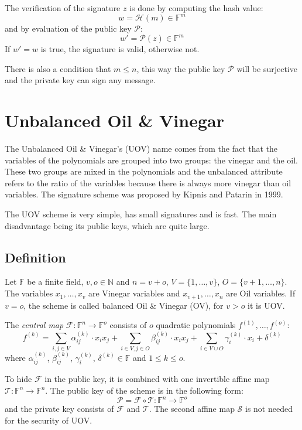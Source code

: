 \documentclass[thesis=M,english]{FITthesis}[2019/12/23]
\begin{document}
The verification of the signature $z$ is done by computing the hash value:
\[
w = \mathcal{H}(m) \in \mathbb{F}^m
\]
and by evaluation of the public key $\mathcal{P}$:
\[
w' = \mathcal{P}(z) \in \mathbb{F}^m
\]
If $w' = w$ is true, the signature is valid, otherwise not.

There is also a condition that $m \leq n$, this way the public key $\mathcal{P}$ will be surjective and the private key can sign any message.

\section{Unbalanced Oil \& Vinegar}
The Unbalanced Oil \& Vinegar's (UOV) name comes from the fact that the variables of the polynomials are grouped into two groups: the vinegar and the oil. These two groups are mixed in the polynomials and the unbalanced attribute refers to the ratio of the variables because there is always more vinegar than oil variables. The signature scheme was proposed by Kipnis and Patarin in 1999.

\bigskip
\noindent
The UOV scheme is very simple, has small signatures and is fast. The main disadvantage being its public keys, which are quite large.

\subsection{Definition}
Let $\mathbb{F}$ be a finite field, $v,o \in \mathbb{N}$ and $n=v+o$, $V=\{1, \ldots, v\}$, $O=\{v+1, \ldots, n\}$. The variables $x_1, \ldots, x_v$ are Vinegar variables and $x_{v+1}, \ldots, x_n$ are Oil variables. If $v=o$, the scheme is called balanced Oil \& Vinegar (OV), for $v>o$ it is UOV.

\bigskip
\noindent
The \textit{central map} $\mathcal{F}:\mathbb{F}^n \rightarrow \mathbb{F}^o$ consists of $o$ quadratic polynomials $f^{(1)}, \ldots, f^{(o)}$:
\[
f^{(k)} = \sum\limits_{i,j \in V}{\alpha_{ij}^{(k)} \cdot x_ix_j} + \sum\limits_{i \in V,j \in O}{\beta_{ij}^{(k)} \cdot x_ix_j}+ \sum\limits_{i \in V \cup O}{\gamma_{i}^{(k)} \cdot x_i} + \delta^{(k)}
\]
where $\alpha_{ij}^{(k)}$, $\beta_{ij}^{(k)}$, $\gamma_{i}^{(k)}$, $\delta^{(k)} \in \mathbb{F}$ and $1 \leq k \leq o$.

\bigskip
\noindent
To hide $\mathcal{F}$ in the public key, it is combined with one invertible affine map $\mathcal{T}: \mathbb{F}^n \rightarrow \mathbb{F}^n$. The public key of the scheme is in the following form:
\[
\mathcal{P} = \mathcal{F} \circ \mathcal{T} : \mathbb{F}^n \rightarrow \mathbb{F}^o
\]
and the private key consists of $\mathcal{F}$ and $\mathcal{T}$. The second affine map $\mathcal{S}$ is not needed for the security of UOV.
\end{document}
